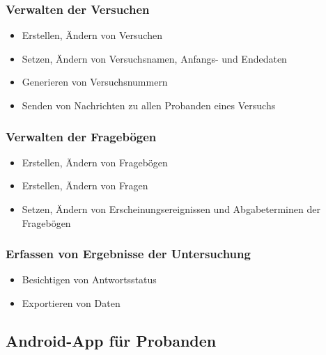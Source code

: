 \documentclass[a4paper]{scrreprt}
\begin{document}
                \subsubsection{Verwalten der Versuchen}
                    \begin{itemize}
                        \item Erstellen, \"Andern von Versuchen
                        \item Setzen, \"Andern von Versuchsnamen, Anfangs- und Endedaten
                        \item Generieren von Versuchsnummern
                        \item Senden von Nachrichten zu allen \gls{Proband}en eines Versuchs
                    \end{itemize}
                
                \subsubsection{Verwalten der Frageb\"ogen}
                    \begin{itemize}
                        \item Erstellen, Ändern von Fragebögen
                        \item Erstellen, \"Andern von Fragen
                        \item Setzen, \"Andern von Erscheinungsereignissen und Abgabeterminen der Fragebögen
                    \end{itemize}

                \subsubsection{Erfassen von Ergebnisse der Untersuchung}
                    \begin{itemize}
                        \item Besichtigen von \gls{Antwortsstatus}
                        \item Exportieren von Daten
                    \end{itemize}
            \vspace*{0.5cm}

            \subsection{\gls{Android-App} f\"ur \gls{Proband}en}
\end{document}
